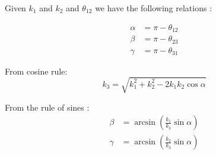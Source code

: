 Given $k_1$ and $k_2$ and $\theta_{12}$ we have the following relations :

\begin{equation}
  \begin{split}
    \alpha &= \pi-\theta_{12}\\
    \beta &= \pi-\theta_{23}\\
    \gamma &= \pi-\theta_{31}
  \end{split}
\end{equation}

From cosine rule:
\begin{equation}
  k_3 = \sqrt{k_1^2 + k_2^2 - 2k_1k_2\cos\alpha}
\end{equation}

From the rule of sines :
\begin{equation}
  \begin{split}
    \beta &= \arcsin\left(\frac{k_1}{k_3}\sin\alpha\right)\\
    \gamma &= \arcsin\left(\frac{k_2}{k_3}\sin\alpha\right)
  \end{split}
\end{equation}

